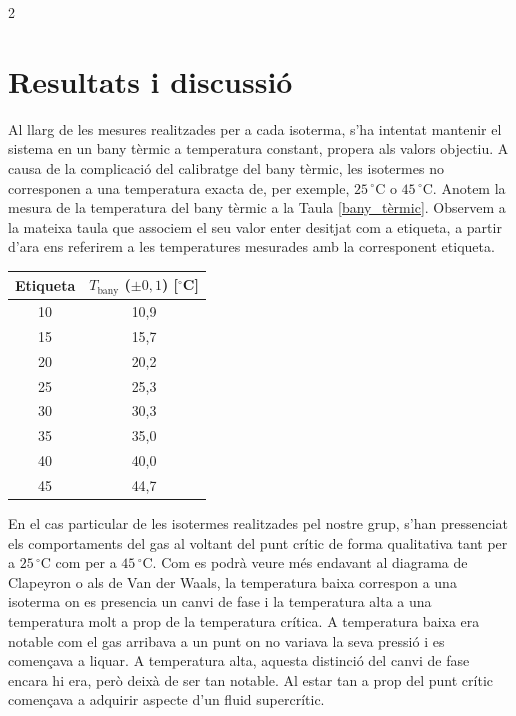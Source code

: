 \documentclass[12pt,twosides,onecolumn,openany]{article}
\newenvironment{Figura}
  {\par\medskip\noindent\minipage{\linewidth}}
  {\endminipage\par\medskip}
\begin{document}
\begin{multicols}{2}
\section{Resultats i discussió}
Al llarg de les mesures realitzades per a cada isoterma, s'ha intentat mantenir el sistema en un bany tèrmic a temperatura constant, propera als valors objectiu. A causa de la complicació del calibratge del bany tèrmic, les isotermes no corresponen a una temperatura exacta de, per exemple, \(25\,^\circ\text{C}\) o \(45\,^\circ\text{C}\). Anotem la mesura de la temperatura del bany tèrmic a la Taula \ref{bany_tèrmic}. Observem a la mateixa taula que associem el seu valor enter desitjat com a etiqueta, a partir d'ara ens referirem a les temperatures mesurades amb la corresponent etiqueta.
\renewcommand{\arraystretch}{1.3}
\begin{Figura}
  \centering
  \begin{tabular}{c|c}
    Etiqueta & $T_{\text{bany}}$ ($\pm0,1$) [$^\circ$C] \\
    \hline\hline
    10 & 10,9 \\
    15 & 15,7 \\
    20 & 20,2 \\
    25 & 25,3 \\
    30 & 30,3 \\
    35 & 35,0 \\
    40 & 40,0 \\
    45 & 44,7 \\
  \end{tabular}
  \label{bany_tèrmic}
\end{Figura}
\renewcommand{\arraystretch}{1}
En el cas particular de les isotermes realitzades pel nostre grup, s'han pressenciat els comportaments del gas al voltant del punt crític de forma qualitativa tant per a \(25 \, ^\circ\text{C}\) com per a \(45 \, ^\circ\text{C}\). Com es podrà veure més endavant al diagrama de Clapeyron o als de Van der Waals, la temperatura baixa correspon a una isoterma on es presencia un canvi de fase i la temperatura alta a una temperatura molt a prop de la temperatura crítica. A temperatura baixa era notable com el gas arribava a un punt on no variava la seva pressió i es començava a liquar. A temperatura alta, aquesta distinció del canvi de fase encara hi era, però deixà de ser tan notable. Al estar tan a prop del punt crític començava a adquirir aspecte d'un fluid supercrític.\\\\

\end{multicols}
\end{document}
